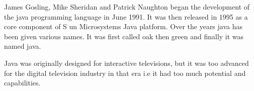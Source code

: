 \documentclass{article}
\begin{document}
	James Gosling, Mike Sheridan and Patrick Naughton began the development of the java programming language in June 1991. It was then released in 1995 as a core component of S un Microsystems Java platform. Over the years java has been given various names. It was first called oak then green and finally it was named java.
	
	Java was originally designed for interactive televisions, but it was too advanced for the digital television industry in that era i.e it had too much potential and capabilities.
\end{document}
